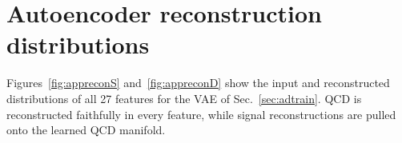 \documentclass[a4paper,11pt]{article}
\newcommand{\ctau}{c\tau}
\newcommand{\pid}{\pi_{\mathrm{D}}}
\begin{document}
\clearpage
\appendix

%
%

\section{Autoencoder reconstruction distributions}
\label{app:recon}

Figures~\ref{fig:appreconS} and~\ref{fig:appreconD} show the input
and reconstructed distributions of all 27 features for the VAE of
Sec.~\ref{sec:adtrain}. QCD is reconstructed faithfully in every
feature, while signal reconstructions are pulled onto the learned QCD
manifold.
\end{document}
